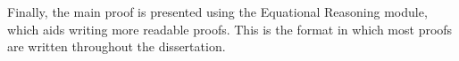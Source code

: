 \documentclass[12pt,twoside,notitlepage]{report}
\begin{document}
\begin{code}
\\
\> \AgdaSymbol{:} \AgdaSymbol{\{} \AgdaSymbol{:} \AgdaSymbol{\}}\<%
\\
\>[2]\<[14]%
\>[14] \AgdaSymbol{(} \AgdaSymbol{:}  \AgdaSymbol{)}\<%
\\
\>[2]\<[14]%
\>[14] \AgdaSymbol{(} \AgdaSymbol{:}  \AgdaSymbol{)}\<%
\\
\>[2]\<[14]%
\>[14]  \AgdaSymbol{(} \AgdaFunction{++} \AgdaSymbol{)}  \AgdaSymbol{(} \AgdaSymbol{)} \AgdaFunction{++} \AgdaSymbol{(} \AgdaSymbol{)}\<%
\\
\end{code}

Finally, the main proof is presented using the Equational Reasoning module, which aids writing more readable proofs. This is the format in which most proofs are written throughout the dissertation.
\end{document}
